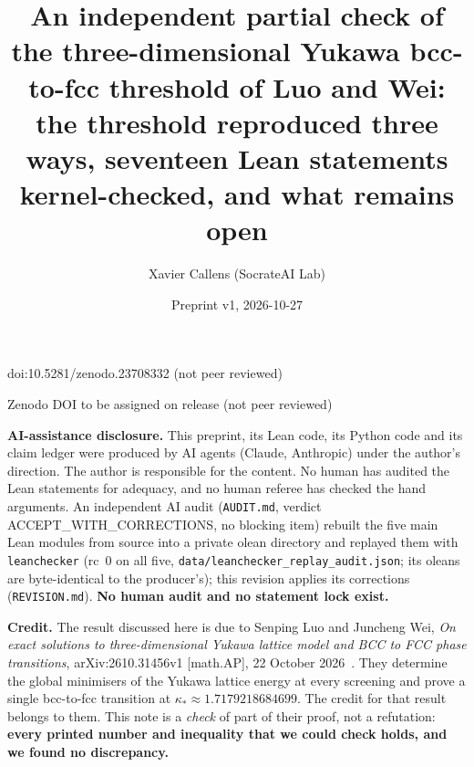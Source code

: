 \documentclass[11pt]{article}
\title{An independent partial check of the three-dimensional Yukawa bcc-to-fcc threshold of Luo and Wei:\\
the threshold reproduced three ways, seventeen Lean statements kernel-checked, and what remains open}
\author{Xavier Callens (SocrateAI Lab)}
\date{Preprint v1, 2026-10-27}
\newcommand{\ks}{\kappa_*}
\begin{document}
\maketitle
\begin{center}\small doi:10.5281/zenodo.23708332 \quad (not peer reviewed)\end{center}

\begin{center}\small Zenodo DOI to be assigned on release \quad (not peer reviewed)\end{center}

\noindent\textbf{AI-assistance disclosure.} This preprint, its Lean code, its Python code and its claim ledger were
produced by AI agents (Claude, Anthropic) under the author's direction. The author is responsible for the content. No human
has audited the Lean statements for adequacy, and no human referee has checked the hand arguments.
An independent AI audit (\texttt{AUDIT.md}, verdict ACCEPT\_WITH\_CORRECTIONS, no blocking item) rebuilt the five main Lean modules from source into a private olean
directory and replayed them with \texttt{leanchecker} (rc~0 on all five, \texttt{data/leanchecker\_replay\_audit.json}; its oleans are byte-identical to the producer's); this revision applies its corrections
(\texttt{REVISION.md}). \textbf{No human audit and no statement lock exist.}

\medskip
\noindent\textbf{Credit.} The result discussed here is due to Senping Luo and Juncheng Wei, \emph{On exact solutions to
three-dimensional Yukawa lattice model and BCC to FCC phase transitions}, arXiv:2610.31456v1 [math.AP], 22 October 2026~\cite{lw}.
They determine the global minimisers of the Yukawa lattice energy at every screening and prove a single bcc-to-fcc transition at
$\ks\approx1.7179218684699$. The credit for that result belongs to them. This note is a \emph{check} of part of their proof, not a
refutation: \textbf{every printed number and inequality that we could check holds, and we found no discrepancy.}
\end{document}
